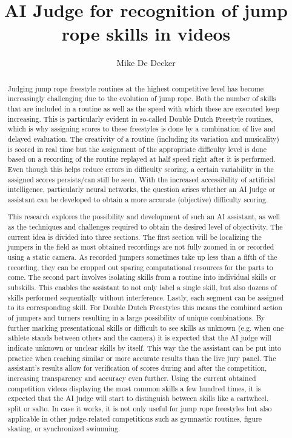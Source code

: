 \documentclass[english]{hogent-article}
\title{AI Judge for recognition of jump rope skills in videos}
\author{Mike De Decker}
\begin{document}
\begin{abstract}
Judging jump rope freestyle routines at the highest competitive level has become increasingly challenging due to the evolution of jump rope. Both the number of skills that are included in a routine as well as the speed with which these are executed keep increasing. This is particularly evident in so-called Double Dutch Freestyle routines, which is why assigning scores to these freestyles is done by a combination of live and delayed evaluation. The creativity of a routine (including its variation and musicality) is scored in real time but the assignment of the appropriate difficulty level is done based on a recording of the routine replayed at half speed right after it is performed. Even though this helps reduce errors in difficulty scoring, a certain variability in the assigned scores persists/can still be seen. With the increased accessibility of artificial intelligence, particularly neural networks, the question arises whether an AI judge or assistant can be developed to obtain a more accurate (objective) difficulty scoring.

This research explores the possibility and development of such an AI assistant, as well as the techniques and challenges required to obtain the desired level of objectivity.
The current idea is divided into three sections. The first section will be localizing the jumpers in the field as most obtained recordings are not fully zoomed in or recorded using a static camera. As recorded jumpers sometimes take up less than a fifth of the recording, they can be cropped out sparing computational resources for the parts to come. The second part involves isolating skills from a routine into individual skills or subskills. This enables the assistant to not only label a single skill, but also dozens of skills performed sequentially without interference. Lastly, each segment can be assigned to its corresponding skill. For Double Dutch Freestyles this means the combined action of jumpers and turners resulting in a large possibility of unique combinations. By further marking presentational skills or difficult to see skills as unknown (e.g. when one athlete stands between others and the camera) it is expected that the AI judge will indicate unknown or unclear skills by itself. This way the the assistant can be put into practice when reaching similar or more accurate results than the live jury panel. The assistant's results allow for verification of scores during and after the competition, increasing transparency and accuracy even further. Using the current obtained competition videos displaying the most common skills a few hundred times, it is expected that the AI judge will start to distinguish between skills like a cartwheel, split or salto.
In case it works, it is not only useful for jump rope freestyles but also applicable in other judge-related competitions such as gymnastic routines, figure skating, or synchronized swimming.
\end{abstract}

\tableofcontents



\printbibliography[heading=bibintoc]
\end{document}

